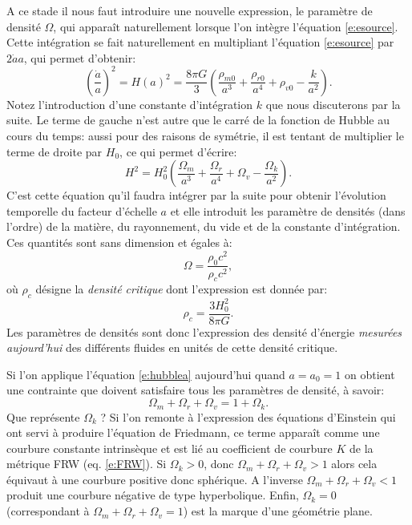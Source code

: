 A ce stade il nous faut introduire une nouvelle expression, le paramètre de densité $\Omega$, qui apparaît naturellement lorsque l'on intègre l'équation \ref{e:esource}. Cette intégration se fait naturellement en multipliant l'équation \ref{e:esource} par $2\dot a a$, qui permet d'obtenir:
\begin{equation}
\left(\frac{\dot a}{a}\right)^2=H(a)^2=\frac{8\pi G}{3}(\frac{\rho_{m0}}{a^3}+\frac{\rho_{r0}}{a^4}+\rho_{v0}-\frac{k}{a^2}).
\end{equation}
Notez l'introduction d'une constante d'intégration $k$ que nous discuterons par la suite. Le terme de gauche n'est autre que le carré de la fonction de Hubble au cours du temps: aussi pour des raisons de symétrie, il est tentant de multiplier le terme de droite par $H_0$, ce qui permet d'écrire:
\begin{equation}
H^2=H_0^2(\frac{\Omega_m}{a^3}+\frac{\Omega_r}{a^4}+\Omega_v-\frac{\Omega_k}{a^2}).
\label{e:hubblea}
\end{equation}
C'est cette équation qu'il faudra intégrer par la suite pour obtenir l'évolution temporelle du facteur d'échelle $a$ et elle introduit les paramètre de densités (dans l'ordre) de la matière, du rayonnement, du vide et de la constante d'intégration. Ces quantités sont sans dimension et égales à:
\begin{equation}
\Omega=\frac{\rho_0 c^2}{\rho_c c^2},
\end{equation}
où $\rho_c$ désigne la \textit{densité critique} dont l'expression est donnée par:
\begin{equation}
\rho_c=\frac{3H_0^2}{8\pi G}.
\end{equation}
Les paramètres de densités sont donc l'expression des densité d'énergie \textit{mesurées aujourd'hui} des différents fluides en unités de cette densité critique.

Si l'on applique l'équation \ref{e:hubblea} aujourd'hui quand $a=a_0=1$ on obtient une contrainte que doivent satisfaire tous les paramètres de densité, à savoir:
\begin{equation}
\Omega_m+\Omega_r+\Omega_v= 1+\Omega_k.
\end{equation}
Que représente $\Omega_k$ ? Si l'on remonte à l'expression des équations d'Einstein qui ont servi à produire l'équation de Friedmann, ce terme apparaît comme une courbure constante intrinsèque et est lié au coefficient de courbure $K$ de la métrique FRW (eq. \ref{e:FRW}). Si $\Omega_k>0$, donc $\Omega_m+\Omega_r+\Omega_v>1$ alors cela équivaut à une courbure positive donc sphérique. A l'inverse $\Omega_m+\Omega_r+\Omega_v<1$ produit une courbure négative de type hyperbolique. Enfin, $\Omega_k=0$  (correspondant à $\Omega_m+\Omega_r+\Omega_v=1$) est la marque d'une géométrie plane. 

